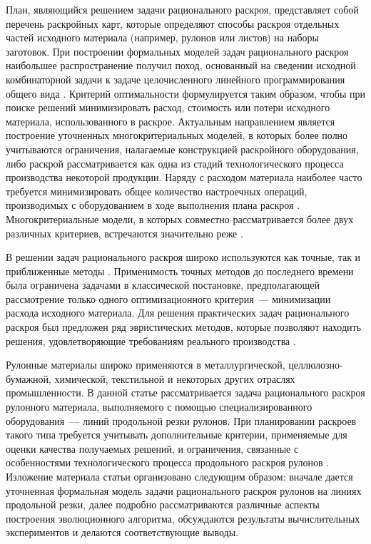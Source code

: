 \documentclass[12pt]{article}
\begin{document}
План, являющийся решением задачи рационального раскроя, представляет собой 
перечень раскройных карт, которые определяют способы раскроя отдельных частей 
исходного материала (например, рулонов или листов) на наборы заготовок. При 
построении формальных моделей задач рационального раскроя наибольшее 
распространение получил поход, основанный на сведении исходной комбинаторной 
задачи к задаче целочисленного линейного программирования общего вида 
\cite{bib:decarvalho02}. 
Критерий оптимальности формулируется таким образом, чтобы при поиске решений 
минимизировать расход, стоимость или потери исходного материала, 
использованного в раскрое. Актуальным направлением является построение 
уточненных многокритериальных моделей, в которых более полно учитываются 
ограничения, налагаемые конструкцией раскройного оборудования, либо раскрой 
рассматривается как одна из стадий технологического процесса производства 
некоторой продукции. Наряду с расходом материала наиболее часто требуется 
минимизировать общее количество настроечных операций, производимых с 
оборудованием в ходе выполнения плана раскроя 
\cite{bib:haessler88, bib:foerster00}. 
Многокритериальные 
модели, в которых совместно рассматривается более двух различных критериев, 
встречаются значительно реже 
\cite{bib:belov07}.

В решении задач рационального раскроя широко используются как точные, так и 
приближенные методы 
\cite{bib:haessler91, bib:golovistikov08}. 
Применимость точных методов до последнего времени 
была ограничена задачами в классической постановке, предполагающей рассмотрение 
только одного оптимизационного критерия~--- минимизации расхода исходного 
материала. Для решения практических задач рационального раскроя был предложен 
ряд эвристических методов, которые позволяют находить решения, удовлетворяющие 
требованиям реального производства 
\cite{bib:haessler88, bib:goulimis90, bib:vahrenkamp96, bib:song06, 
bib:golfeto09, bib:huang09}.

Рулонные материалы широко применяются в металлургической, целлюлозно-бумажной, 
химической, текстильной и некоторых других отраслях промышленности. В данной 
статье рассматривается задача рационального раскроя рулонного материала, 
выполняемого с помощью специализированного оборудования~--- линий продольной 
резки рулонов. При планировании раскроев такого типа требуется учитывать 
дополнительные критерии, применяемые для оценки качества получаемых решений, и 
ограничения, связанные с особенностями технологического процесса продольного 
раскроя рулонов 
\cite{bib:haessler88, bib:song06}. 
Изложение материала статьи организовано следующим образом: 
вначале дается уточненная формальная модель задачи рационального раскроя 
рулонов на линиях продольной резки, далее подробно рассматриваются различные 
аспекты построения эволюционного алгоритма, обсуждаются результаты 
вычислительных экспериментов и делаются соответствующие выводы.
\end{document}
